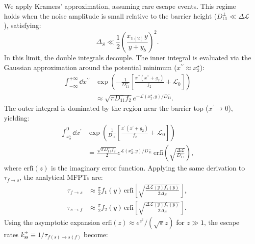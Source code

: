 \documentclass[aps,prx,reprint,superscriptaddress,longbibliography,nofootinbib,floatfix]{revtex4-2}
\begin{document}
We apply Kramers' approximation, assuming rare escape events. This regime holds when the noise amplitude is small relative to the barrier height ($D_{11}^\pm \ll \Delta \mathcal{L}$), satisfying:
\begin{equation}
    \Delta_S \ll \frac{1}{2} \left(\frac{x_{1(2)}y}{y+y_{b}}\right)^2.
\end{equation}
In this limit, the double integrals decouple. The inner integral is evaluated via the Gaussian approximation around the potential minimum ($x^{\prime\prime} \approx x_2^{\star}$):
\begin{equation}
\begin{split}
    \int_{-\infty}^{+\infty} \dd x^{\prime\prime} &\exp\left({-\frac{1}{D_{11}^-}\left[\frac{x^{\prime\prime}(x^{\prime\prime}+g_2)}{f_2} + \mathcal{L}_0 \right]}\right) \\
    &\approx \sqrt{\pi D_{11}^-f_2} e^{-\mathcal{L}(x_2^{\star},y)/D_{11}^-}.
\end{split}
\end{equation}
The outer integral is dominated by the region near the barrier top ($x^{\prime} \to 0$), yielding:
\begin{equation}
\begin{split}
   \int_{x_2^{\star}}^{0} \dd x^{\prime} &\exp\left({\frac{1}{D_{11}^-}\left[\frac{x^{\prime}(x^{\prime}+g_2)}{f_2} + \mathcal{L}_0 \right]}\right) \\
   &= \frac{\sqrt{\pi D_{11}^- f_2}}{2}  e^{\mathcal{L}(x_2^{\star},y)/D_{11}^-} \,\mathrm{erfi}\left(\sqrt{\frac{\Delta\mathcal{L}}{D_{11}^{-}}}\right),
\end{split}
\end{equation}
where $\mathrm{erfi}(z)$ is the imaginary error function. Applying the same derivation to $\tau_{f \to s}$, the analytical MFPTs are:
\begin{equation} \label{eq:MFPT_solutions}
    \begin{aligned} 
    \tau_{f \to s} &\approx  \frac{\pi}{2} f_1(y) \, \mathrm{erfi}\left[\sqrt{\frac{\Delta \mathcal{L}(y)f_1(y)}{2\Delta_S}}\right], \\
    \tau_{s \to f} &\approx \frac{\pi}{2} f_2(y) \, \mathrm{erfi}\left[\sqrt{\frac{\Delta \mathcal{L}(y)f_2(y)}{2\Delta_S}}\right].
    \end{aligned}
\end{equation}
Using the asymptotic expansion $\mathrm{erfi}(z) \approx e^{z^2}/(\sqrt{\pi} z)$ for $z \gg 1$, the escape rates $k_\mathrm{ss}^{\pm} \equiv 1/\tau_{f(s) \to s(f)}$ become:
\end{document}
